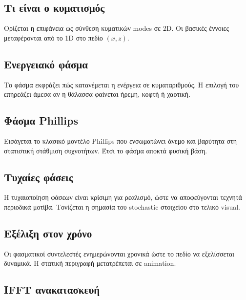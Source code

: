 \documentclass[a4paper, 11pt]{article}
\begin{document}
\subsection{Τι είναι ο
κυματισμός}\label{ux3c4ux3b9-ux3b5ux3afux3bdux3b1ux3b9-ux3bf-ux3baux3c5ux3bcux3b1ux3c4ux3b9ux3c3ux3bcux3ccux3c2}

Ορίζεται η επιφάνεια ως σύνθεση κυματικών modes σε 2D. Οι βασικές
έννοιες μεταφέρονται από το 1D στο πεδίο \((x,z)\).

\subsection{Ενεργειακό
φάσμα}\label{ux3b5ux3bdux3b5ux3c1ux3b3ux3b5ux3b9ux3b1ux3baux3cc-ux3c6ux3acux3c3ux3bcux3b1}

Το φάσμα εκφράζει πώς κατανέμεται η ενέργεια σε κυματαριθμούς. Η επιλογή
του επηρεάζει άμεσα αν η θάλασσα φαίνεται ήρεμη, κοφτή ή χαοτική.

\subsection{Φάσμα Phillips}\label{ux3c6ux3acux3c3ux3bcux3b1-phillips}

Εισάγεται το κλασικό μοντέλο Phillips που ενσωματώνει άνεμο και βαρύτητα
στη στατιστική στάθμιση συχνοτήτων. Έτσι το φάσμα αποκτά φυσική βάση.

\subsection{Τυχαίες
φάσεις}\label{ux3c4ux3c5ux3c7ux3b1ux3afux3b5ux3c2-ux3c6ux3acux3c3ux3b5ux3b9ux3c2}

Η τυχαιοποίηση φάσεων είναι κρίσιμη για ρεαλισμό, ώστε να αποφεύγονται
τεχνητά περιοδικά μοτίβα. Τονίζεται η σημασία του stochastic στοιχείου
στο τελικό visual.

\subsection{Εξέλιξη στον
χρόνο}\label{ux3b5ux3beux3adux3bbux3b9ux3beux3b7-ux3c3ux3c4ux3bfux3bd-ux3c7ux3c1ux3ccux3bdux3bf}

Οι φασματικοί συντελεστές ενημερώνονται χρονικά ώστε το πεδίο να
εξελίσσεται δυναμικά. Η στατική περιγραφή μετατρέπεται σε animation.

\subsection{IFFT
ανακατασκευή}\label{ifft-ux3b1ux3bdux3b1ux3baux3b1ux3c4ux3b1ux3c3ux3baux3b5ux3c5ux3ae}
\end{document}
